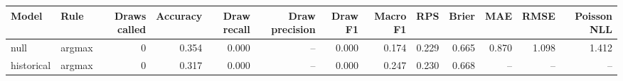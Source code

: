 
\begin{tabular}{llrrrrrrrrrrr}
\toprule
Model & Rule & Draws called & Accuracy & Draw recall & Draw precision & Draw F1 & Macro F1 & RPS & Brier & MAE & RMSE & Poisson NLL\\
\midrule
null & argmax & 0 & 0.354 & 0.000 & -- & 0.000 & 0.174 & 0.229 & 0.665 & 0.870 & 1.098 & 1.412\\
historical & argmax & 0 & 0.317 & 0.000 & -- & 0.000 & 0.247 & 0.230 & 0.668 & -- & -- & --\\
\bottomrule
\end{tabular}
